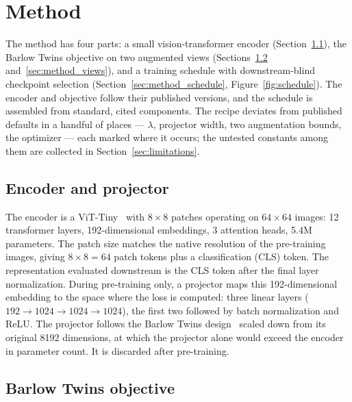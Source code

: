 \section{Method}
\label{sec:method}

The method has four parts: a small vision-transformer encoder
(Section~\ref{sec:method_arch}), the Barlow Twins objective on two augmented
views (Sections~\ref{sec:method_loss} and~\ref{sec:method_views}), and a
training schedule with downstream-blind checkpoint selection
(Section~\ref{sec:method_schedule}, Figure~\ref{fig:schedule}). The encoder
and objective follow their published versions, and the schedule is assembled
from standard, cited components. The recipe deviates from published defaults
in a handful of places --- $\lambda$, projector width, two augmentation
bounds, the optimizer --- each marked where it occurs; the untested
constants among them are collected in Section~\ref{sec:limitations}.

\subsection{Encoder and projector}
\label{sec:method_arch}

The encoder is a ViT-Tiny~\cite{dosovitskiy2021vit,touvron2021deit} with
$8\times8$ patches operating on $64\times64$ images: 12 transformer layers,
192-dimensional embeddings, 3 attention heads, 5.4M parameters. The patch
size matches the native resolution of the pre-training images, giving
$8\times8=64$ patch tokens plus a classification (CLS) token. The
representation evaluated downstream is the CLS token after the final layer
normalization. During pre-training only, a projector maps this
192-dimensional embedding to the space where the loss is computed: three
linear layers ($192\rightarrow1024\rightarrow1024\rightarrow1024$), the first
two followed by batch normalization and ReLU. The projector follows the
Barlow Twins design~\cite{zbontar2021barlow} scaled down from its original
8192 dimensions, at which the projector alone would exceed the encoder in
parameter count. It is discarded after pre-training.

\subsection{Barlow Twins objective}
\label{sec:method_loss}


